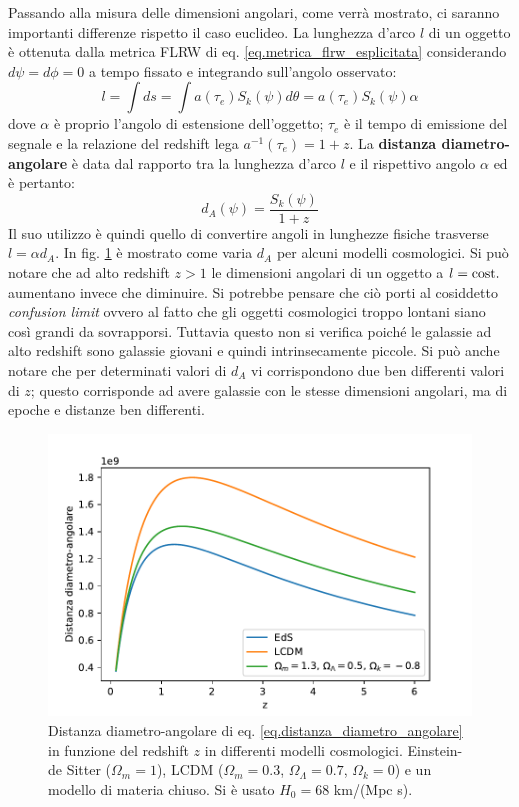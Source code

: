 Passando alla misura delle dimensioni angolari, come verrà mostrato, ci saranno importanti differenze rispetto il caso euclideo. La lunghezza d'arco $l$ di un oggetto è ottenuta dalla metrica FLRW di eq. \ref{eq.metrica_flrw_esplicitata} considerando $d\psi = d\phi =0$ a tempo fissato e integrando sull'angolo osservato:
\begin{equation*}
    l = \int ds = \int a(\tau_e)S_k(\psi)d\theta = a(\tau_e)S_k(\psi)\alpha
\end{equation*}
dove $\alpha$ è proprio l'angolo di estensione dell'oggetto; $\tau_e$ è il tempo di emissione del segnale e la relazione del redshift lega $a^{-1}(\tau_e) = 1+ z$. La \textbf{distanza diametro-angolare} è data dal rapporto tra la lunghezza d'arco $l$ e il rispettivo angolo $\alpha$ ed è pertanto:
\begin{equation}
    d_A(\psi) = \frac{S_k(\psi)}{1+z}
    \label{eq.distanza_diametro_angolare}
\end{equation}
Il suo utilizzo è quindi quello di convertire angoli in lunghezze fisiche trasverse $l = \alpha d_A$. In fig. \ref{fig.distanza_diametro_angolare_modelli} è mostrato come varia $d_A$ per alcuni modelli cosmologici. Si può notare che ad alto redshift $z>1$ le dimensioni angolari di un oggetto a $l=\textrm{cost.}$ aumentano invece che diminuire. Si potrebbe pensare che ciò porti al cosiddetto \textit{confusion limit} ovvero al fatto che gli oggetti cosmologici troppo lontani siano così grandi da sovrapporsi. Tuttavia questo non si verifica poiché le galassie ad alto redshift sono galassie giovani e quindi intrinsecamente piccole.
Si può anche notare che per determinati valori di $d_A$ vi corrispondono due ben differenti valori di $z$; questo corrisponde ad avere galassie con le stesse dimensioni angolari, ma di epoche e distanze ben differenti.
\begin{figure}[b]
    \centering
    \includegraphics[scale=0.7]{immagini/distanza_diametro_angolare.pdf}
    \caption{Distanza diametro-angolare di eq. \ref{eq.distanza_diametro_angolare} in funzione del redshift $z$ in differenti modelli cosmologici. Einstein-de Sitter ($\Omega_m =1$), LCDM ($\Omega_m=0.3$, $\Omega_\Lambda = 0.7$, $\Omega_k= 0$) e un modello di materia chiuso. Si è usato $H_0 = 68 $ km/(Mpc s).}
    \label{fig.distanza_diametro_angolare_modelli}
\end{figure}

